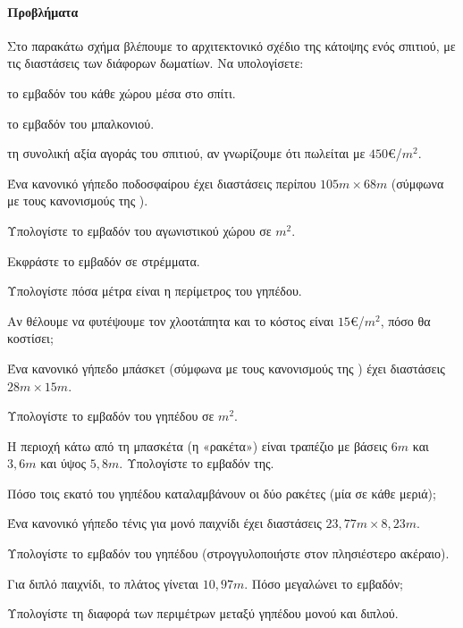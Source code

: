\documentclass[11pt,a4paper,modern]{FFExercises}
\begin{document}
\paragraph{Προβλήματα}
\askhsh Στο παρακάτω σχήμα βλέπουμε το αρχιτεκτονικό σχέδιο της κάτοψης ενός σπιτιού, με τις διαστάσεις των διάφορων δωματίων. Να υπολογίσετε:
\begin{center}

\end{center}
\begin{alist}
\item το εμβαδόν του κάθε χώρου μέσα στο σπίτι.
\item το εμβαδόν του μπαλκονιού.
\item τη συνολική αξία αγοράς του σπιτιού, αν γνωρίζουμε ότι πωλείται με $450$\euro/$\si{m^2}$.
\end{alist}
\askhsh Ένα κανονικό γήπεδο ποδοσφαίρου έχει διαστάσεις περίπου $105\si{m}\times 68\si{m}$ (σύμφωνα με τους κανονισμούς της ).
\begin{alist}
\item Υπολογίστε το εμβαδόν του αγωνιστικού χώρου σε $\si{m^2}$.
\item Εκφράστε το εμβαδόν σε στρέμματα.
\item Υπολογίστε πόσα μέτρα είναι η περίμετρος του γηπέδου.
\item Αν θέλουμε να φυτέψουμε τον χλοοτάπητα και το κόστος είναι $15$\euro/$\si{m^2}$, πόσο θα κοστίσει;
\end{alist}

\askhsh Ένα κανονικό γήπεδο μπάσκετ (σύμφωνα με τους κανονισμούς της ) έχει διαστάσεις $28\si{m}\times 15\si{m}$.
\begin{alist}
\item Υπολογίστε το εμβαδόν του γηπέδου σε $\si{m^2}$.
\item Η περιοχή κάτω από τη μπασκέτα (η «ρακέτα») είναι τραπέζιο με βάσεις $6\si{m}$ και $3{,}6\si{m}$ και ύψος $5{,}8\si{m}$. Υπολογίστε το εμβαδόν της.
\item Πόσο τοις εκατό του γηπέδου καταλαμβάνουν οι δύο ρακέτες (μία σε κάθε μεριά);
\end{alist}

\askhsh Ένα κανονικό γήπεδο τένις για μονό παιχνίδι έχει διαστάσεις $23{,}77\si{m}\times 8{,}23\si{m}$.
\begin{alist}
\item Υπολογίστε το εμβαδόν του γηπέδου (στρογγυλοποιήστε στον πλησιέστερο ακέραιο).
\item Για διπλό παιχνίδι, το πλάτος γίνεται $10{,}97\si{m}$. Πόσο μεγαλώνει το εμβαδόν;
\item Υπολογίστε τη διαφορά των περιμέτρων μεταξύ γηπέδου μονού και διπλού.
\end{alist}
\end{document}
